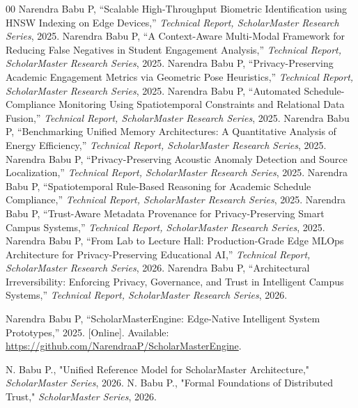 \documentclass[conference]{IEEEtran}
\begin{document}
\begin{thebibliography}{00}
 Narendra Babu P, ``Scalable High-Throughput Biometric Identification using HNSW Indexing on Edge Devices,'' \textit{Technical Report, ScholarMaster Research Series}, 2025.
 Narendra Babu P, ``A Context-Aware Multi-Modal Framework for Reducing False Negatives in Student Engagement Analysis,'' \textit{Technical Report, ScholarMaster Research Series}, 2025.
 Narendra Babu P, ``Privacy-Preserving Academic Engagement Metrics via Geometric Pose Heuristics,'' \textit{Technical Report, ScholarMaster Research Series}, 2025.
 Narendra Babu P, ``Automated Schedule-Compliance Monitoring Using Spatiotemporal Constraints and Relational Data Fusion,'' \textit{Technical Report, ScholarMaster Research Series}, 2025.
 Narendra Babu P, ``Benchmarking Unified Memory Architectures: A Quantitative Analysis of Energy Efficiency,'' \textit{Technical Report, ScholarMaster Research Series}, 2025.
 Narendra Babu P, ``Privacy-Preserving Acoustic Anomaly Detection and Source Localization,'' \textit{Technical Report, ScholarMaster Research Series}, 2025.
 Narendra Babu P, ``Spatiotemporal Rule-Based Reasoning for Academic Schedule Compliance,'' \textit{Technical Report, ScholarMaster Research Series}, 2025.
 Narendra Babu P, ``Trust-Aware Metadata Provenance for Privacy-Preserving Smart Campus Systems,'' \textit{Technical Report, ScholarMaster Research Series}, 2025.
 Narendra Babu P, ``From Lab to Lecture Hall: Production-Grade Edge MLOps Architecture for Privacy-Preserving Educational AI,'' \textit{Technical Report, ScholarMaster Research Series}, 2026.
 Narendra Babu P, ``Architectural Irreversibility: Enforcing Privacy, Governance, and Trust in Intelligent Campus Systems,'' \textit{Technical Report, ScholarMaster Research Series}, 2026.

 Narendra Babu P, ``ScholarMasterEngine: Edge-Native Intelligent System Prototypes,'' 2025. [Online]. Available: \url{https://github.com/NarendraaP/ScholarMasterEngine}.


 N. Babu P., "Unified Reference Model for ScholarMaster Architecture," \textit{ScholarMaster Series}, 2026.
 N. Babu P., "Formal Foundations of Distributed Trust," \textit{ScholarMaster Series}, 2026.
\end{thebibliography}
\end{document}
